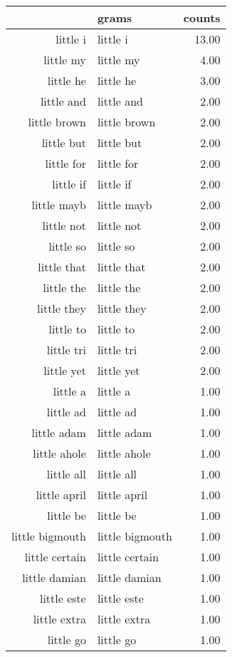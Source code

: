 \begin{table}[ht]
\centering
\begin{tabular}{rlr}
  \hline
 & grams & counts \\ 
  \hline
little i & little i & 13.00 \\ 
  little my & little my & 4.00 \\ 
  little he & little he & 3.00 \\ 
  little and & little and & 2.00 \\ 
  little brown & little brown & 2.00 \\ 
  little but & little but & 2.00 \\ 
  little for & little for & 2.00 \\ 
  little if & little if & 2.00 \\ 
  little mayb & little mayb & 2.00 \\ 
  little not & little not & 2.00 \\ 
  little so & little so & 2.00 \\ 
  little that & little that & 2.00 \\ 
  little the & little the & 2.00 \\ 
  little they & little they & 2.00 \\ 
  little to & little to & 2.00 \\ 
  little tri & little tri & 2.00 \\ 
  little yet & little yet & 2.00 \\ 
  little a & little a & 1.00 \\ 
  little ad & little ad & 1.00 \\ 
  little adam & little adam & 1.00 \\ 
  little ahole & little ahole & 1.00 \\ 
  little all & little all & 1.00 \\ 
  little april & little april & 1.00 \\ 
  little be & little be & 1.00 \\ 
  little bigmouth & little bigmouth & 1.00 \\ 
  little certain & little certain & 1.00 \\ 
  little damian & little damian & 1.00 \\ 
  little este & little este & 1.00 \\ 
  little extra & little extra & 1.00 \\ 
  little go & little go & 1.00 \\ 

\end{tabular}
\end{table}
